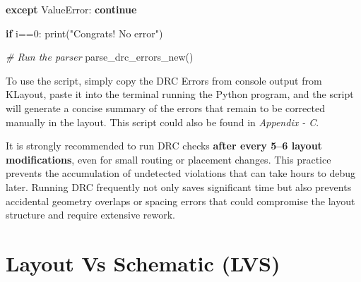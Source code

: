 \documentclass[
  11pt,
  a4paper,
  oneside]{scrbook}
\newenvironment{Shaded}{}{}
\newcommand{\BuiltInTok}[1]{\textcolor[rgb]{0.00,0.50,0.00}{#1}}
\newcommand{\CommentTok}[1]{\textcolor[rgb]{0.38,0.63,0.69}{\textit{#1}}}
\newcommand{\ControlFlowTok}[1]{\textcolor[rgb]{0.00,0.44,0.13}{\textbf{#1}}}
\newcommand{\DecValTok}[1]{\textcolor[rgb]{0.25,0.63,0.44}{#1}}
\newcommand{\NormalTok}[1]{#1}
\newcommand{\OperatorTok}[1]{\textcolor[rgb]{0.40,0.40,0.40}{#1}}
\newcommand{\PreprocessorTok}[1]{\textcolor[rgb]{0.74,0.48,0.00}{#1}}
\newcommand{\StringTok}[1]{\textcolor[rgb]{0.25,0.44,0.63}{#1}}
\begin{document}
\begin{tcolorbox}
\begin{Shaded}
\begin{Highlighting}[]
            \ControlFlowTok{except} \PreprocessorTok{ValueError}\NormalTok{:}
                \ControlFlowTok{continue}
    
    \ControlFlowTok{if}\NormalTok{ i}\OperatorTok{==}\DecValTok{0}\NormalTok{:}
        \BuiltInTok{print}\NormalTok{(}\StringTok{"Congrats! No error"}\NormalTok{)}
\end{Highlighting}
\end{Shaded}

\begin{Shaded}
\begin{Highlighting}[]
\CommentTok{\# Run the parser}
\NormalTok{parse\_drc\_errors\_new()}
\end{Highlighting}
\end{Shaded}

\end{tcolorbox}

To use the script, simply copy the DRC Errors from console output from
KLayout, paste it into the terminal running the Python program, and the
script will generate a concise summary of the errors that remain to be
corrected manually in the layout. This script could also be found in
\emph{Appendix - C}.

\begin{tcolorbox}[enhanced jigsaw, opacityback=0, breakable, colback=white, left=2mm, toprule=.15mm, arc=.35mm, coltitle=black, leftrule=.75mm, colbacktitle=quarto-callout-tip-color!10!white, rightrule=.15mm, colframe=quarto-callout-tip-color-frame, titlerule=0mm, title=\textcolor{quarto-callout-tip-color}{\faLightbulb}\hspace{0.5em}{Pro Tip Run DRC Early and Often}, toptitle=1mm, bottomtitle=1mm, bottomrule=.15mm, opacitybacktitle=0.6]

It is strongly recommended to run DRC checks \textbf{after every 5--6
layout modifications}, even for small routing or placement changes. This
practice prevents the accumulation of undetected violations that can
take hours to debug later. Running DRC frequently not only saves
significant time but also prevents accidental geometry overlaps or
spacing errors that could compromise the layout structure and require
extensive rework.

\end{tcolorbox}

\chapter{Layout Vs Schematic (LVS)}\label{layout-vs-schematic-lvs}
\end{document}
